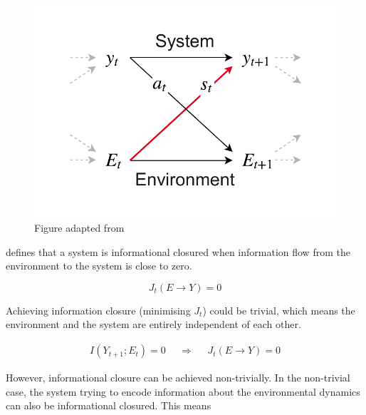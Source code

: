 \documentclass[utf8]{article}
\begin{document}
				\begin{figure}
					\includegraphics[width=\textwidth]{WritingMaterials/Fig_SystemAndEnv/SystemAndEnv.pdf}
					\caption{Figure adapted from \cite{BERTSCHINGER.2006}}
					\label{fig:SystemAndEnv}
				\end{figure}


			\noindent
			\cite{BERTSCHINGER.2006} defines that a system is informational closured when information flow from the environment to the system is close to zero.

				\begin{equation}
				J_{t}(E \rightarrow Y )=0
				\end{equation}


			\noindent
			Achieving information closure (minimising $J_t$) could be trivial, which means the environment and the system are entirely independent of each other.

				\begin{equation}
				\begin{aligned}
				{I(Y_{t+1};E_{t})=0}&&{\Rightarrow}&&{J_{t}(E \rightarrow Y )=0}
				\end{aligned}
				\end{equation}


			\noindent
			However, informational closure can be achieved non-trivially. In the non-trivial case, the system trying to encode information about the environmental dynamics can also be informational closured. This means
\end{document}
